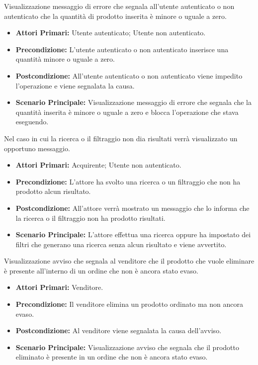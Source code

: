 Visualizzazione messaggio di errore che segnala all'utente autenticato o non autenticato che la quantità di prodotto inserita è minore o uguale a zero.
\begin{itemize}
    \item \textbf{Attori Primari:} Utente autenticato; Utente non autenticato.
    \item \textbf{Precondizione:} L'utente autenticato o non autenticato inserisce una quantità minore o uguale a zero.
    \item \textbf{Postcondizione:} All'utente autenticato o non autenticato viene impedito l'operazione e viene segnalata la causa.
    \item \textbf{Scenario Principale:} Visualizzazione messaggio di errore che segnala che la quantità inserita è minore o uguale a zero e blocca l'operazione che stava eseguendo.
\end{itemize}

Nel caso in cui la ricerca o il filtraggio non dia risultati verrà visualizzato un opportuno messaggio.
\begin{itemize}
	\item \textbf{Attori Primari:} Acquirente; Utente non autenticato. 
	\item \textbf{Precondizione:} L'attore ha svolto una ricerca o un filtraggio che non ha prodotto alcun risultato.
	\item \textbf{Postcondizione:} All'attore verrà mostrato un messaggio che lo informa che la ricerca o il filtraggio non ha prodotto risultati.
	\item \textbf{Scenario Principale:} L'attore effettua una ricerca oppure ha impostato dei filtri che generano una ricerca senza alcun risultato e viene avvertito.
\end{itemize}

Visualizzazione avviso che segnala al venditore che il prodotto che vuole eliminare è presente all'interno di un ordine che non è ancora stato evaso.
\begin{itemize}
    \item \textbf{Attori Primari:} Venditore.
    \item \textbf{Precondizione:} Il venditore elimina un prodotto ordinato ma non ancora evaso.
    \item \textbf{Postcondizione:} Al venditore viene segnalata la causa dell'avviso.
    \item \textbf{Scenario Principale:} Visualizzazione avviso che segnala che il prodotto eliminato è presente in un ordine che non è ancora stato evaso.
\end{itemize}
